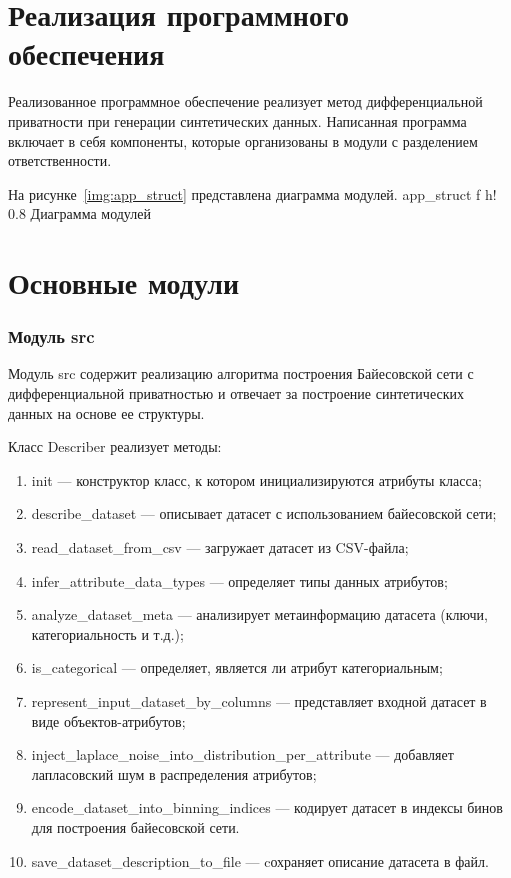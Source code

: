 \section{Реализация программного обеспечения}

Реализованное программное обеспечение реализует метод дифференциальной приватности при генерации синтетических данных.
Написанная программа включает в себя компоненты, которые организованы в модули с разделением ответственности.

На рисунке~\ref{img:app_struct} представлена диаграмма модулей.
{app_struct} %
{f} %
{h!} %
{0.8\textwidth} %
{Диаграмма модулей} %


\section{Основные модули}

\subsubsection{Модуль src}

Модуль src содержит реализацию алгоритма построения Байесовской сети с дифференциальной приватностью и отвечает за построение синтетических данных на основе ее структуры.


Класс Describer реализует методы:
\begin{enumerate}[label*=---]
	\item init --- конструктор класс, к котором инициализируются атрибуты класса;
	\item describe\_dataset --- описывает датасет с использованием байесовской сети;
	\item read\_dataset\_from\_csv --- загружает датасет из CSV-файла;
	\item infer\_attribute\_data\_types --- определяет типы данных атрибутов;
	\item analyze\_dataset\_meta --- анализирует метаинформацию датасета (ключи, категориальность и т.д.);
	\item is\_categorical --- определяет, является ли атрибут категориальным;
	\item represent\_input\_dataset\_by\_columns --- представляет входной датасет в виде объектов-атрибутов;
	\item inject\_laplace\_noise\_into\_distribution\_per\_attribute --- добавляет лапласовский шум в распределения атрибутов;
	\item encode\_dataset\_into\_binning\_indices --- кодирует датасет в индексы бинов для построения байесовской сети.
	\item save\_dataset\_description\_to\_file --- cохраняет описание датасета в файл.
\end{enumerate}


